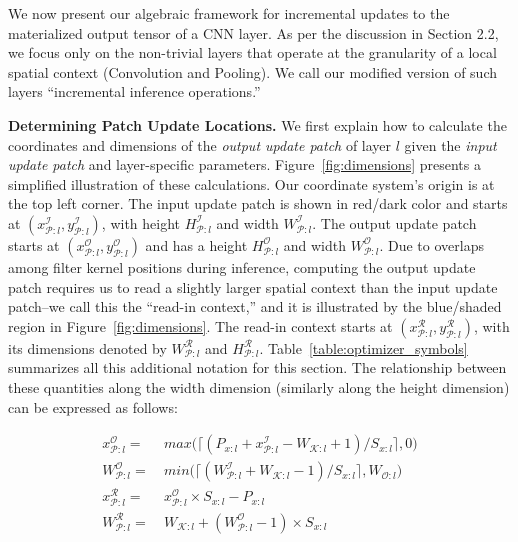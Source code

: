 We now present our algebraic framework for incremental updates to the materialized output tensor of a CNN layer. As per the discussion in Section 2.2, we focus only on the non-trivial layers that operate at the granularity of a local spatial context (Convolution and Pooling). We call our modified version of such layers ``incremental inference operations.''

\vspace{2mm}
\noindent \textbf{Determining Patch Update Locations.} We first explain how to calculate the coordinates and dimensions of the \textit{output update patch} of layer $l$ given the \textit{input update patch} and layer-specific parameters. Figure~\ref{fig:dimensions} presents a simplified illustration of these calculations. Our coordinate system's origin is at the top left corner. The input update patch is shown in red/dark color and starts at $(x^\mathcal{I}_{\mathcal{P}:l}, y^\mathcal{I}_{\mathcal{P}:l})$, with height $H^\mathcal{I}_{\mathcal{P}:l}$ and width $W^\mathcal{I}_{\mathcal{P}:l}$. The output update patch starts at $(x^\mathcal{O}_{\mathcal{P}:l}, y^\mathcal{O}_{\mathcal{P}:l})$ and has a height $H^\mathcal{O}_{\mathcal{P}:l}$ and width $W^\mathcal{O}_{\mathcal{P}:l}$. Due to overlaps among filter kernel positions during inference, computing the output update patch requires us to read a slightly larger spatial context than the input update patch--we call this the ``read-in context,'' and it is illustrated by the blue/shaded region in Figure~\ref{fig:dimensions}. The read-in context starts at $(x^\mathcal{R}_{\mathcal{P}:l}, y^\mathcal{R}_{\mathcal{P}:l})$, with its dimensions denoted by $W^\mathcal{R}_{\mathcal{P}:l}$ and $H^\mathcal{R}_{\mathcal{P}:l}$. Table~\ref{table:optimizer_symbols} summarizes all this additional notation for this section. The relationship between these quantities along the width dimension (similarly along the height dimension) can be expressed as follows:

\vspace{-3mm}
\begin{align}
\label{eqn:xcoordinate}
x^\mathcal{O}_{\mathcal{P}:l} =&~ max\big(\lceil (P_{x:l} + x^\mathcal{I}_{\mathcal{P}:l} - W_{\mathcal{K}:l} + 1)/S_{x:l} \rceil, 0\big)\\
\label{eqn:patchwidth}
W^\mathcal{O}_{\mathcal{P}:l} =&~ min\big(\lceil (W^\mathcal{I}_{\mathcal{P}:l} + W_{\mathcal{K}:l} - 1)/ S_{x:l} \rceil, W_{\mathcal{O}:l}\big)\\
\label{eqn:xreadcoordinate}
x^\mathcal{R}_{\mathcal{P}:l} =&~ x^\mathcal{O}_{\mathcal{P}:l} \times S_{x:l} - P_{x:l}\\
\label{eqn:readpatchwidth}
W^\mathcal{R}_{\mathcal{P}:l} =&~ W_{\mathcal{K}:l} + (W^\mathcal{O}_{\mathcal{P}:l}-1) \times S_{x:l}
\end{align}
\vspace{-8mm}

